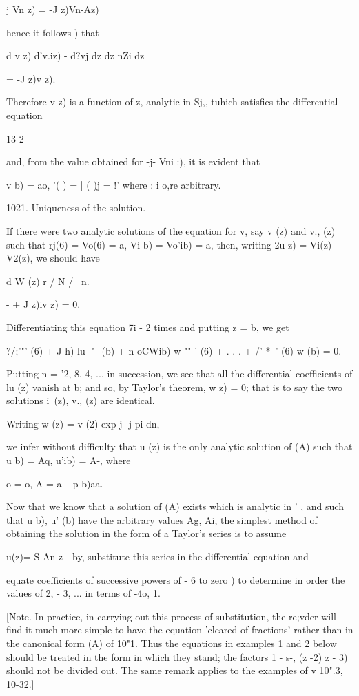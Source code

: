 j Vn z) = -J z)Vn-Az)\

hence it follows ) that

d v z) d'v.iz) - d?vj dz dz nZi dz

= -J z)v z).

Therefore v z) is a function of z, analytic in Sj,, tuhich satisfies
the differential equation

13-2

%
%

and, from the value obtained for -j- Vni :), it is evident that

v b) = ao, '( ) = | ( )j = !' where : i o,re arbitrary.

1021. Uniqueness of the solution.

If there were two analytic solutions of the equation for v, say v (z)
and v., (z) such that rj(6) = Vo(6) = a, Vi b) = Vo'ib) = a, then,
writing 2u z) = Vi(z)-V2(z), we should have

d W (z) r / N / \ n.

- + J z)iv z) = 0.

Differentiating this equation 7i - 2 times and putting z = b, we get

?/;'"' (6) + J h) lu -"- (b) + n-oCWib) w ""-' (6) + . . . + /' *--'
(6) w (b) = 0.

Putting n = '2, 8, 4, ... in succession, we see that all the
differential coefficients of lu (z) vanish at b; and so, by Taylor's
theorem, w z) = 0; that is to say the two solutions i\ (z), v., (z)
are identical.

Writing w (z) = v (2) exp j- j pi dn,

we infer without difficulty that u (z) is the only analytic solution
of (A) such that u b) = Aq, u'ib) = A-, where

 o = o, A = a -\ p b)aa.

Now that we know that a solution of (A) exists which is analytic in '
, and such that u b), u' (b) have the arbitrary values Ag, Ai, the
simplest method of obtaining the solution in the form of a Taylor's
series is to assume

u(z)= S An z - by, substitute this series in the differential
equation and

equate coefficients of successive powers of - 6 to zero ) to
determine in order the values of 2, - 3, ... in terms of -4o, 1.

[Note. In practice, in carrying out this process of substitution, the
re;vder will find it much more simple to have the equation 'cleared of
fractions' rather than in the canonical form (A) of 10"1. Thus the
equations in examples 1 and 2 below should be treated in the form in
which they stand; the factors 1 - s-, (z -2) z - 3) should not be
divided out. The same remark applies to the examples of v 10".3,
10-32.]

